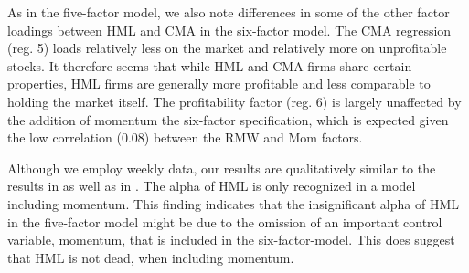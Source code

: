 As in the five-factor model, we also note differences in some of the other factor loadings between HML and CMA in the six-factor model. The CMA regression (reg. 5) loads relatively less on the market and relatively more on unprofitable stocks. It therefore seems that while HML and CMA firms share certain properties, HML firms are generally more profitable and less comparable to holding the market itself. The profitability factor (reg. 6) is largely unaffected by the addition of momentum the six-factor specification, which is expected given the low correlation (0.08) between the RMW and Mom factors. 

Although we employ weekly data, our results are qualitatively similar to the results in \textcite{FF2015} as well as in \textcite{Asness2015}. The alpha of HML is only recognized in a model including momentum. This finding indicates that the insignificant alpha of HML in the five-factor model might be due to the omission of an important control variable, momentum, that is included in the six-factor-model. This does suggest that HML is not dead, when including momentum.


